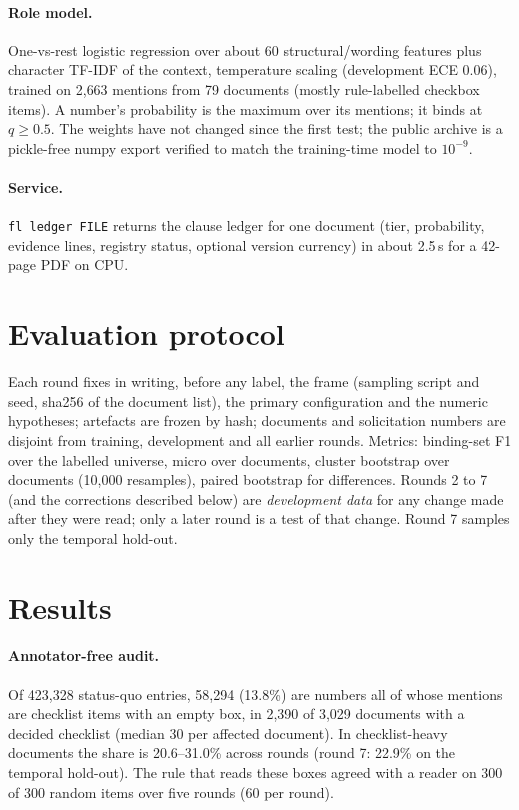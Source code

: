 \documentclass[11pt]{article}
\begin{document}
\paragraph{Role model.} One-vs-rest logistic regression over about 60 structural/wording features plus character TF-IDF of the context, temperature scaling (development ECE 0.06), trained on 2{,}663 mentions from 79 documents (mostly rule-labelled checkbox items). A number's probability is the maximum over its mentions; it binds at $q\ge0.5$. The weights have not changed since the first test; the public archive is a pickle-free numpy export verified to match the training-time model to $10^{-9}$.
\paragraph{Service.} \texttt{fl ledger FILE} returns the clause ledger for one document (tier, probability, evidence lines, registry status, optional version currency) in about 2.5\,s for a 42-page PDF on CPU.

\section{Evaluation protocol}
Each round fixes in writing, before any label, the frame (sampling script and seed, sha256 of the document list), the primary configuration and the numeric hypotheses; artefacts are frozen by hash; documents and solicitation numbers are disjoint from training, development and all earlier rounds. Metrics: binding-set F1 over the labelled universe, micro over documents, cluster bootstrap over documents (10{,}000 resamples), paired bootstrap for differences. Rounds 2 to 7 (and the corrections described below) are \emph{development data} for any change made after they were read; only a later round is a test of that change. Round 7 samples only the temporal hold-out.

\section{Results}
\paragraph{Annotator-free audit.} Of 423{,}328 status-quo entries, 58{,}294 (13.8\%) are numbers all of whose mentions are checklist items with an empty box, in 2{,}390 of 3{,}029 documents with a decided checklist (median 30 per affected document). In checklist-heavy documents the share is 20.6--31.0\% across rounds (round 7: 22.9\% on the temporal hold-out). The rule that reads these boxes agreed with a reader on 300 of 300 random items over five rounds (60 per round).
\end{document}
